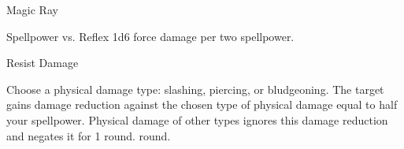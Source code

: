 \begin{spellsection}{Magic Ray}
    \begin{spellheader}
    \end{spellheader}
    \begin{spellcontent}
        \begin{spelltargetinginfo}
        \end{spelltargetinginfo}
        \begin{spelleffects}
            \begin{spellattack}{Spellpower vs. Reflex}
                \spellsuccess 1d6 force damage  per two spellpower.
            \end{spellattack}
        \end{spelleffects}
    \end{spellcontent}
    \begin{spellfooter}
        \spellnotes \forcespellnotes
    \end{spellfooter}
\end{spellsection}

\begin{spellsection}{Resist Damage}
    \begin{spellheader}
    \end{spellheader}
    \begin{spellcontent}
        \begin{spelltargetinginfo}
        \end{spelltargetinginfo}
        \begin{spelleffects}
            \spellspecial Choose a physical damage type: slashing, piercing, or bludgeoning.
            \spelleffect The target gains damage reduction against the chosen type of physical damage equal to half your spellpower. Physical damage of other types ignores this damage reduction and negates it for 1 round.
             round.
        \end{spelleffects}
    \end{spellcontent}
    \begin{spellfooter}
    \end{spellfooter}
\end{spellsection}

